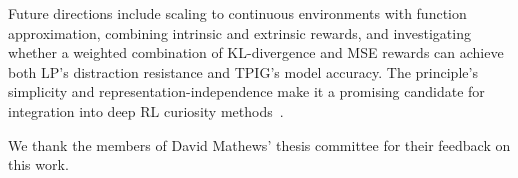\documentclass[letterpaper]{article}
\begin{document}
Future directions include scaling to continuous environments with
function approximation, combining intrinsic and extrinsic rewards,
and investigating whether a weighted combination of KL-divergence and
MSE rewards can achieve both LP's distraction resistance and TPIG's
model accuracy.
The principle's simplicity and representation-independence make it a
promising candidate for integration into deep RL curiosity
methods~\citep{Pathak2017ICM,Burda2019RND}.

\begin{ack}
We thank the members of David Mathews' thesis committee for their
feedback on this work.
\end{ack}

\FloatBarrier


\end{document}
